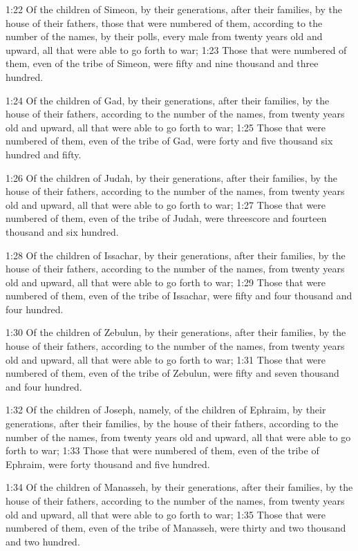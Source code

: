 1:22 Of the children of Simeon, by their generations, after their families, by the house of their fathers, those that were numbered of them, according to the number of the names, by their polls, every male from twenty years old and upward, all that were able to go forth to war; 1:23 Those that were numbered of them, even of the tribe of Simeon, were fifty and nine thousand and three hundred.

1:24 Of the children of Gad, by their generations, after their families, by the house of their fathers, according to the number of the names, from twenty years old and upward, all that were able to go forth to war; 1:25 Those that were numbered of them, even of the tribe of Gad, were forty and five thousand six hundred and fifty.

1:26 Of the children of Judah, by their generations, after their families, by the house of their fathers, according to the number of the names, from twenty years old and upward, all that were able to go forth to war; 1:27 Those that were numbered of them, even of the tribe of Judah, were threescore and fourteen thousand and six hundred.

1:28 Of the children of Issachar, by their generations, after their families, by the house of their fathers, according to the number of the names, from twenty years old and upward, all that were able to go forth to war; 1:29 Those that were numbered of them, even of the tribe of Issachar, were fifty and four thousand and four hundred.

1:30 Of the children of Zebulun, by their generations, after their families, by the house of their fathers, according to the number of the names, from twenty years old and upward, all that were able to go forth to war; 1:31 Those that were numbered of them, even of the tribe of Zebulun, were fifty and seven thousand and four hundred.

1:32 Of the children of Joseph, namely, of the children of Ephraim, by their generations, after their families, by the house of their fathers, according to the number of the names, from twenty years old and upward, all that were able to go forth to war; 1:33 Those that were numbered of them, even of the tribe of Ephraim, were forty thousand and five hundred.

1:34 Of the children of Manasseh, by their generations, after their families, by the house of their fathers, according to the number of the names, from twenty years old and upward, all that were able to go forth to war; 1:35 Those that were numbered of them, even of the tribe of Manasseh, were thirty and two thousand and two hundred.

